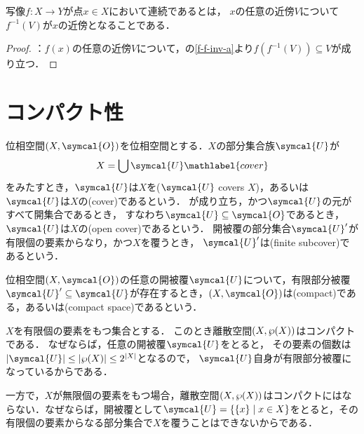 \documentclass{ltjsbook}
\begin{document}
\begin{thmbox}
\begin{proposition}
写像\(f\colon X \to Y\)が点\(x \in X\)において連続であるとは，
\(x\)の任意の近傍\(V\)について\(f^{-1}(V)\)が\(x\)の近傍となることである．
\end{proposition}
\end{thmbox}

\begin{proof}
：\(f(x)\)の任意の近傍\(V\)について，の\ref{f-f-inv-a}より\(f(f^{-1}(V)) \subseteq V\)が成り立つ．
\end{proof}


\section{コンパクト性}
\begin{thmbox}
\begin{definition}
    位相空間\(\tuple{X, \symcal{O}}\)を位相空間とする．\(X\)の部分集合族\(\symcal{U}\)が
\begin{align}
    X = \bigcup \symcal{U}
    \mathlabel{cover}
\end{align}
をみたすとき，\(\symcal{U}\)は\(X\)を(\(\symcal{U}\) covers \(X\))，あるいは
\(\symcal{U}\)は\(X\)の(cover)であるという．
が成り立ち，かつ\(\symcal{U}\)の元がすべて開集合であるとき，
すなわち\(\symcal{U} \subseteq \symcal{O}\)であるとき，
\(\symcal{U}\)は\(X\)の(open cover)であるという．
開被覆の部分集合\(\symcal{U}'\)が有限個の要素からなり，かつ\(X\)を覆うとき，
\(\symcal{U}'\)は(finite subcover)であるという．

位相空間\(\tuple{X, \symcal{O}}\)の任意の開被覆\(\symcal{U}\)について，有限部分被覆\(\symcal{U}' \subseteq \symcal{U}\)が存在するとき，\(\tuple{X, \symcal{O}}\)は(compact)である，あるいは(compact space)であるという．
\end{definition}
\end{thmbox}

\begin{example} \(X\)を有限個の要素をもつ集合とする．
このとき離散空間\((X, \wp(X))\)はコンパクトである．
なぜならば，任意の開被覆\(\symcal{U}\)をとると，
その要素の個数は\(\lvert\symcal{U}\rvert \leq \lvert \wp(X)\rvert \leq 2^{\lvert X \rvert}\)となるので，
\(\symcal{U}\)自身が有限部分被覆になっているからである．

一方で，\(X\)が無限個の要素をもつ場合，離散空間\((X, \wp(X))\)はコンパクトにはならない．なぜならば，開被覆として\(\symcal{U} = \{\{x\} \mid x \in X\}\)をとると，その有限個の要素からなる部分集合で\(X\)を覆うことはできないからである．
\end{example}
\end{document}
